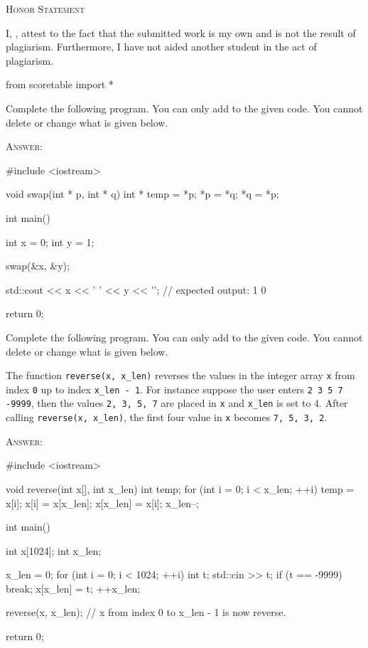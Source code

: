



\begin{center}
  \textsc{Honor Statement}
\end{center}
I, ,
attest to the fact that the submitted work is my own and
is not the result of plagiarism.
Furthermore, I have not aided another student in the act of
plagiarism.

\begin{python}
from scoretable import *
\end{python}
        
\newpage
\nextq
Complete the following program. You can only add to the given code.
You cannot delete or change what is given below.

\textsc{Answer:}
\begin{answercode}
#include <iostream>

void swap(int * p, int * q)
{
int * temp = *p;
*p = *q;
*q = *p;
}


int main()
{
    int x = 0;
    int y = 1;

    swap(&x, &y);
    
    std::cout << x << ' ' << y << '\n'; // expected output: 1 0
    
    return 0;
}
\end{answercode}

\newpage
\nextq
Complete the following program.
You can only add to the given code. 
You cannot delete or change what is given below.

The function \verb!reverse(x, x_len)! reverses the values in the integer
array \verb!x!
from index \verb!0! up to index \verb!x_len - 1!.
For instance suppose the user enters \verb!2 3 5 7 -9999!, then
the values \verb!2, 3, 5, 7! are placed in \verb!x!
and \verb!x_len! is set to 4.
After calling \verb!reverse(x, x_len)!,
the first four value in \verb!x! becomes \verb!7, 5, 3, 2!.

\textsc{Answer:}
\begin{answercode}
#include <iostream>

void reverse(int x[], int x_len)
{
int temp;
for (int i = 0; i < x_len; ++i)
{
  temp = x[i];
  x[i] = x[x_len];
  x[x_len] = x[i];
  x_len--;
}
}


int main()
{
    int x[1024];
    int x_len;

    x_len = 0;
    for (int i = 0; i < 1024; ++i)
    {
        int t;
        std::cin >> t;
        if (t == -9999)
        {
            break;
        }
        x[x_len] = t;
        ++x_len;
    }

    reverse(x, x_len);
    // x from index 0 to x_len - 1 is now reverse.
    
    return 0;
}
\end{answercode}

